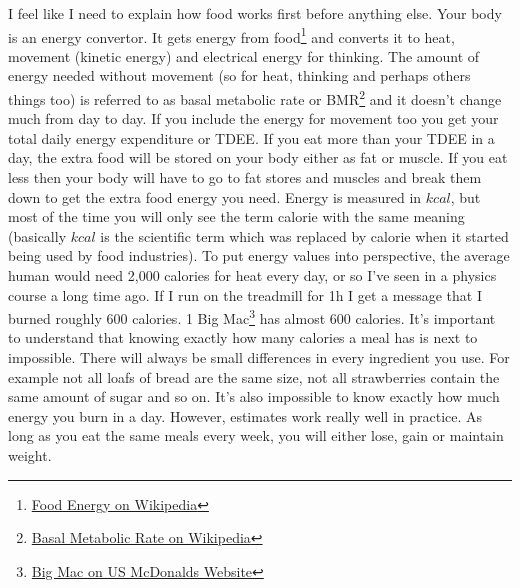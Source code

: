 \documentclass[openany, 12pt]{book}
\begin{document}
	I feel like I need to explain how food works first before anything else. Your body is an energy convertor. It gets energy from food\footnote{\href{https://en.wikipedia.org/wiki/Food_energy}{Food Energy on Wikipedia}} and converts it to heat, movement (kinetic energy) and 
	electrical energy for thinking. The amount of energy needed without movement (so for heat, thinking and perhaps others things too) is referred 
	to as basal metabolic rate or BMR\footnote{\href{https://en.wikipedia.org/wiki/Basal_metabolic_rate}{Basal Metabolic Rate on Wikipedia}} and it
	doesn't change much from day to day. If you include the energy for movement too you get your total daily energy expenditure or TDEE. If you eat
	more than your TDEE in a day, the extra food will be stored on your body either as fat or muscle. If you eat less then your body will have to go
	to fat stores and muscles and break them down to get the extra food energy you need. Energy is measured in $kcal$, but most of the time you will
	only see the term calorie with the same meaning (basically $kcal$ is the scientific term which was replaced by calorie when it started being used
	by food industries). To put energy values into perspective, the average human would need 2,000 calories for heat every day, or so I've seen in a
	physics course a long time ago. If I run on the treadmill for 1h I get a message that I burned roughly 600 calories. 1 Big Mac\footnote{\href{
	https://www.mcdonalds.com/us/en-us/product/big-mac.html}{Big Mac on US McDonalds Website}} has almost 600 calories. It's important to
	understand that knowing exactly how many calories a meal has is next to impossible. There will always be small differences in every ingredient you
	use. For example not all loafs of bread are the same size, not all strawberries contain the same amount of sugar and so on. It's also impossible to
	know exactly how much energy you burn in a day. However, estimates work really well in practice. As long as you eat the same meals every week, you 
	will either lose, gain or maintain weight.
	
\end{document}
